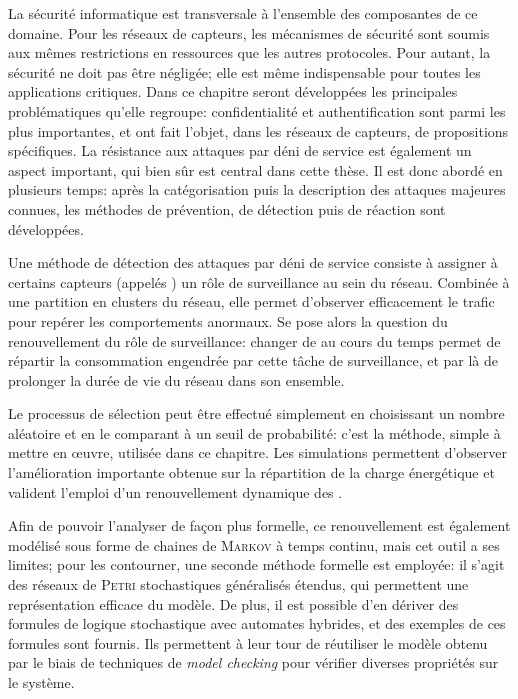 La sécurité informatique est transversale à l'ensemble des composantes de ce domaine.
Pour les réseaux de capteurs, les mécanismes de sécurité sont soumis aux mêmes restrictions en ressources que les autres protocoles.
Pour autant, la sécurité ne doit pas être négligée; elle est même indispensable pour toutes les applications critiques.
Dans ce chapitre seront développées les principales problématiques qu'elle regroupe: confidentialité et authentification sont parmi les plus importantes, et ont fait l'objet, dans les réseaux de capteurs, de propositions spécifiques.
La résistance aux attaques par déni de service est également un aspect important, qui bien sûr est central dans cette thèse.
Il est donc abordé en plusieurs temps: après la catégorisation puis la description des attaques majeures connues, les méthodes de prévention, de détection puis de réaction sont développées.

Une méthode de détection des attaques par déni de service consiste à assigner à certains capteurs (appelés \cnst) un rôle de surveillance au sein du réseau.
Combinée à une partition en clusters du réseau, elle permet d'observer efficacement le trafic pour repérer les comportements anormaux.
Se pose alors la question du renouvellement du rôle de surveillance: changer de \cnst au cours du temps permet de répartir la consommation engendrée par cette tâche de surveillance, et par là de prolonger la durée de vie du réseau dans son ensemble.

Le processus de sélection peut être effectué simplement en choisissant un nombre aléatoire et en le comparant à un seuil de probabilité: c'est la méthode, simple à mettre en œuvre, utilisée dans ce chapitre.
Les simulations permettent d'observer l'amélioration importante obtenue sur la répartition de la charge énergétique et valident l'emploi d'un renouvellement dynamique des \cnst.

Afin de pouvoir l'analyser de façon plus formelle, ce renouvellement est également modélisé sous forme de chaines de \textsc{Markov} à temps continu, mais cet outil a ses limites; pour les contourner, une seconde méthode formelle est employée: il s'agit des réseaux de \textsc{Petri} stochastiques généralisés étendus, qui permettent une représentation efficace du modèle.
De plus, il est possible d'en dériver des formules de logique stochastique avec automates hybrides, et des exemples de ces formules sont fournis. Ils permettent à leur tour de réutiliser le modèle obtenu par le biais de techniques de \textit{model checking} pour vérifier diverses propriétés sur le système.

